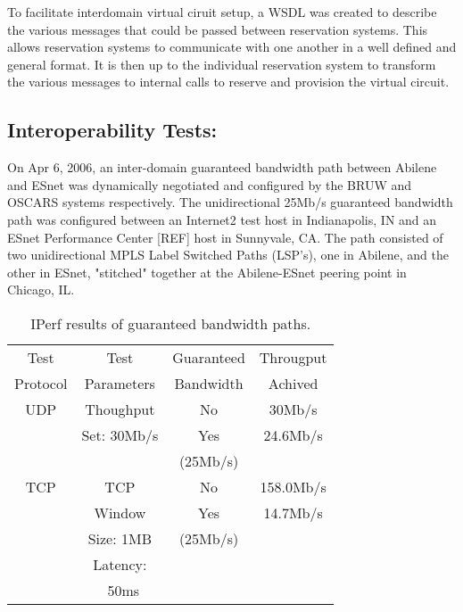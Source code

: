 \documentclass[conference]{IEEEtran}
\begin{document}
To facilitate interdomain virtual ciruit setup, 
a WSDL was created to describe the various
messages that could be passed between reservation systems. This allows
reservation systems to communicate with one another in a
well defined and general format. It is then up to the individual reservation system to 
transform the various messages to internal calls to reserve and provision the virtual circuit.

\subsection{Interoperability Tests: }

On Apr 6, 2006, an inter-domain guaranteed bandwidth path between Abilene and 
ESnet was dynamically negotiated and configured by the BRUW and OSCARS systems 
respectively. The unidirectional 25Mb/s guaranteed bandwidth path was 
configured between an Internet2 test host in Indianapolis, IN and an ESnet 
Performance Center [REF] host in Sunnyvale, CA.  The path consisted of two 
unidirectional MPLS Label Switched Paths (LSP's), one in Abilene, and the 
other in ESnet, "stitched" together at the Abilene-ESnet peering point in 
Chicago, IL.

\begin{table}
 \centering
 {\scriptsize
 \begin{tabular}{|c|c|c|c|}
 \hline
 Test     & Test       & Guaranteed & Througput  \\ 
 Protocol & Parameters & Bandwidth  & Achived    \\ \hline \hline 
 UDP      & Thoughput  & No         &   30Mb/s   \\ \cline{3-4}
          & Set: 30Mb/s& Yes        &   24.6Mb/s \\ 
          &            & (25Mb/s)   &            \\ \hline 
 TCP      & TCP        & No         & 158.0Mb/s  \\ \cline{3-4}
          & Window     & Yes        &  14.7Mb/s  \\ 
          & Size: 1MB  & (25Mb/s)   &            \\ 
          & Latency:   &            &            \\ 
          & ~50ms      &            &            \\ \hline
 \end{tabular}
 }
 \caption{IPerf results of guaranteed bandwidth paths.}
 \label{tab:bandwidth}
\end{table}
\end{document}
